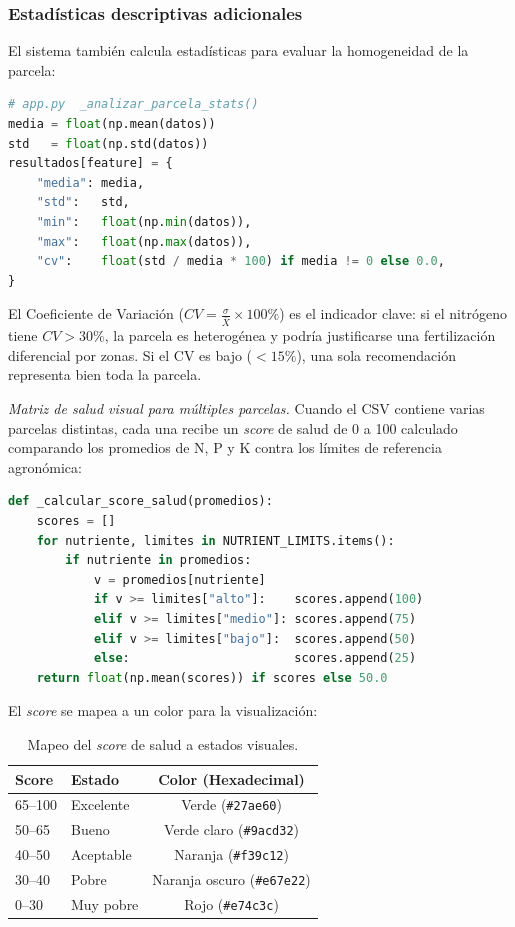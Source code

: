 \documentclass[12pt]{article}
\begin{document}
\subsubsection{Estadísticas descriptivas adicionales}
El sistema también calcula estadísticas para evaluar la homogeneidad de la parcela:

\begin{lstlisting}[language=Python]
# app.py  _analizar_parcela_stats()
media = float(np.mean(datos))
std   = float(np.std(datos))
resultados[feature] = {
    "media": media,
    "std":   std,
    "min":   float(np.min(datos)),
    "max":   float(np.max(datos)),
    "cv":    float(std / media * 100) if media != 0 else 0.0,
}
\end{lstlisting}

El Coeficiente de Variación ($CV = \frac{\sigma}{\bar{X}} \times 100\%$) es el indicador clave: si el nitrógeno tiene $CV > 30\%$, la parcela es heterogénea y podría justificarse una fertilización diferencial por zonas. Si el CV es bajo ($< 15\%$), una sola recomendación representa bien toda la parcela.

\noindent\textit{Matriz de salud visual para múltiples parcelas.} Cuando el CSV contiene varias parcelas distintas, cada una recibe un \textit{score} de salud de 0 a 100 calculado comparando los promedios de N, P y K contra los límites de referencia agronómica:

\begin{lstlisting}[language=Python]
def _calcular_score_salud(promedios):
    scores = []
    for nutriente, limites in NUTRIENT_LIMITS.items():
        if nutriente in promedios:
            v = promedios[nutriente]
            if v >= limites["alto"]:    scores.append(100)
            elif v >= limites["medio"]: scores.append(75)
            elif v >= limites["bajo"]:  scores.append(50)
            else:                       scores.append(25)
    return float(np.mean(scores)) if scores else 50.0
\end{lstlisting}

El \textit{score} se mapea a un color para la visualización:

\begin{table}[htpb]
\centering
\caption{Mapeo del \textit{score} de salud a estados visuales.}
\label{tab:score_salud_visual}
\begin{tabular}{llc}
\toprule
\textbf{Score} & \textbf{Estado} & \textbf{Color (Hexadecimal)} \\
\midrule
65--100 & Excelente  & Verde (\texttt{\#27ae60}) \\
50--65  & Bueno      & Verde claro (\texttt{\#9acd32}) \\
40--50  & Aceptable  & Naranja (\texttt{\#f39c12}) \\
30--40  & Pobre      & Naranja oscuro (\texttt{\#e67e22}) \\
0--30   & Muy pobre  & Rojo (\texttt{\#e74c3c}) \\
\bottomrule
\end{tabular}
\end{table}
\end{document}
